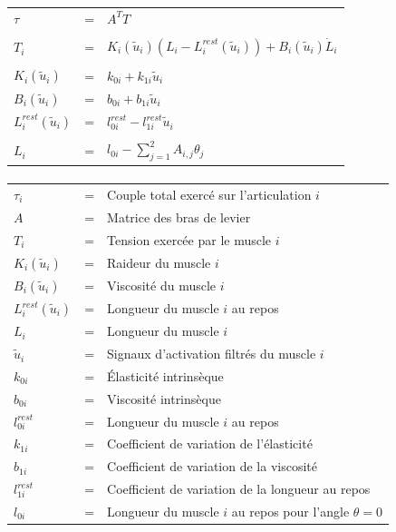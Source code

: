 \documentclass[pdftex,a4paper,11pt]{article}
\begin{document}
\begin{tabular}{lcl}
    $\tau$ & = & $A^T T$ \\
    & & \\
    $T_i$                     & = & $K_i(\tilde{u}_i) (L_i - L_i^{rest}(\tilde{u}_i)) + B_i(\tilde{u}_i) \dot{L}_i$ \\
    & & \\
    $K_i(\tilde{u}_i)$        & = & $k_{0i} + k_{1i} \tilde{u}_i$ \\
    $B_i(\tilde{u}_i)$        & = & $b_{0i} + b_{1i} \tilde{u}_i$ \\
    $L_i^{rest}(\tilde{u}_i)$ & = & $ l_{0i}^{rest} - l_{1i}^{rest} \tilde{u}_i$ \\
    & & \\
    $L_i$ & = & $l_{0i} - \sum_{j=1}^2 A_{i,j} \theta_j $ \\
\end{tabular}

\paragraph{}
\begin{tabular}{lcl}
    $\tau_i$ & = & Couple total exercé sur l'articulation $i$ \\
    $A$  & = & Matrice des bras de levier \\
    $T_i$  & = & Tension exercée par le muscle $i$ \\
    $K_i(\tilde{u}_i)$ & = & Raideur du muscle $i$ \\
    $B_i(\tilde{u}_i)$ & = & Viscosité du muscle $i$ \\
    $L_i^{rest}(\tilde{u}_i)$ & = & Longueur du muscle $i$ au repos \\
    $L_i$ & = & Longueur du muscle $i$ \\
    $\tilde{u}_i$ & = & Signaux d'activation filtrés du muscle $i$ \\
    $k_{0i}$ & = & Élasticité intrinsèque \\
    $b_{0i}$ & = & Viscosité intrinsèque \\
    $l^{rest}_{0i}$ & = & Longueur du muscle $i$ au repos \\
    $k_{1i}$ & = & Coefficient de variation de l'élasticité \\
    $b_{1i}$ & = & Coefficient de variation de la viscosité \\
    $l^{rest}_{1i}$ & = & Coefficient de variation de la longueur au repos \\
    $l_{0i}$ & = & Longueur du muscle $i$ au repos pour l'angle $\theta = 0$ \\
\end{tabular}
\end{document}
